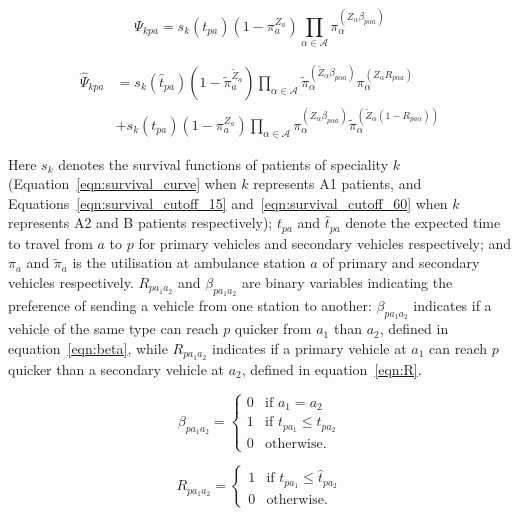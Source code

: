 \documentclass[preprint,12pt]{elsarticle}
\begin{document}
\begin{equation}\label{eqn:survival_A}
\Psi_{kpa} = s_k\left( t_{pa} \right) \left(1 - \pi_{a}^{Z_a} \right) \prod_{\alpha \in \mathcal{A}} \pi_{\alpha}^{\left(Z_{\alpha} \beta_{p\alpha a} \right)}
\end{equation}

\begin{align}\label{eqn:survival_B}
\hat{\Psi}_{kpa} &= s_k\left(\hat{t}_{pa}\right) \left(1 - \tilde{\pi}_{a}^{\tilde{Z}_a} \right) \prod_{\alpha \in \mathcal{A}} \tilde{\pi}_{\alpha}^{\left(\tilde{Z}_{\alpha} \beta_{p\alpha a}\right)} \pi_{\alpha}^{\left(Z_{\alpha} R_{p \alpha a}\right) } \nonumber \\
&+ s_k\left(t_{pa}\right) \left(1 - \pi_{a}^{Z_a} \right) \prod_{\alpha \in \mathcal{A}} \pi_{\alpha}^{\left(Z_{\alpha}\beta_{p\alpha a}\right)} \tilde{\pi}_{\alpha}^{\left(\tilde{Z}_{\alpha} \left(1 - R _{p a\alpha}\right)\right)}
\end{align}

Here $s_k$ denotes the survival functions of patients of speciality $k$ (Equation~\ref{eqn:survival_curve} when $k$ represents A1 patients, and Equations~\ref{eqn:survival_cutoff_15} and~\ref{eqn:survival_cutoff_60} when $k$ represents A2 and B patients respectively); $t_{pa}$ and $\hat{t}_{pa}$ denote the expected time to travel from $a$ to $p$ for primary vehicles and secondary vehicles respectively; and $\pi_{a}$ and $\tilde{\pi}_{a}$ is the utilisation at ambulance station $a$ of primary and secondary vehicles respectively.
$R_{p a_1 a_2}$ and $\beta_{p a_1 a_2}$ are binary variables indicating the preference of sending a vehicle from one station to another:
$\beta_{p a_1 a_2}$ indicates if a vehicle of the same type can reach $p$ quicker from $a_1$ than $a_2$, defined in equation~\ref{eqn:beta}, while $R_{p a_1 a_2}$ indicates if a primary vehicle at $a_1$ can reach $p$ quicker than a secondary vehicle at $a_2$, defined in equation~\ref{eqn:R}.

\begin{equation}\label{eqn:beta}
\beta_{p a_1 a_2} = \begin{cases}
    0 & \text{if } a_1 = a_2\\
    1 & \text{if } t_{p a_1} \leq t_{p a_2}\\
    0 & \text{otherwise.}
\end{cases}
\end{equation}

\begin{equation}\label{eqn:R}
R_{p a_1 a_2} = \begin{cases}
    1 & \text{if } t_{p a_1} \leq \hat{t}_{p a_2}\\
    0 & \text{otherwise.}
\end{cases}
\end{equation}
\end{document}
